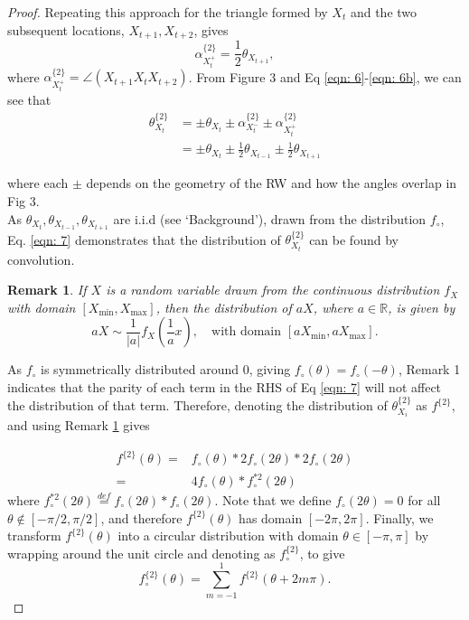 \documentclass[english]{article}
\newtheorem{rem}{Remark}
\begin{document}
\begin{proof}
Repeating this approach for the triangle formed by $X_t$ and the two subsequent locations, $X_{t+1}, X_{t+2}$, gives 
\begin{equation}
    \alpha^{\{2\}}_{X^+_t}=\frac{1}{2}\theta_{X_{t+1}},
    \label{eqn: 6b}
\end{equation}
where $\alpha^{\{2\}}_{X^+_t}=\angle \left(X_{t+1}X_{t}X_{t+2}\right)$.
From Figure 3 and Eq \ref{eqn: 6}-\ref{eqn: 6b},  we can see that 
\begin{align}\nonumber
\theta^{\{2\}}_{X_t}&=\pm\theta_{X_t}\pm\alpha^{\{2\}}_{X^-_t}\pm\alpha^{\{2\}}_{X^+_t}\\
&=\pm\theta_{X_t}\pm\frac{1}{2}\theta_{X_{t-1}}\pm\frac{1}{2}\theta_{X_{t+1}}
\label{eqn: 7}
\end{align}

where each $\pm$ depends on the geometry of the RW and how the angles overlap in Fig 3.\\

As $\theta_{X_t},\theta_{X_{t-1}},\theta_{X_{t+1}}$ are i.i.d (see `Background'), drawn from the distribution $f_\circ$, Eq. \ref{eqn: 7} demonstrates that the distribution of $\theta^{\{2\}}_{X_t}$ can be found by convolution.\\


\begin{rem}
If $X$ is a random variable drawn from the continuous distribution $f_X$ with domain $[X_{\text{min}},X_{\text{max}}]$, then the distribution of $aX$, where $a\in\mathbb{R}$, is given by 
\begin{equation}
    aX\sim\frac{1}{|a|}f_X\left(\frac{1}{a}x\right),\quad \text{with domain }[aX_{\text{min}},aX_{\text{max}}].
    \label{eqn: aX dist}
\end{equation}
\label{rem:1}
\end{rem}


\noindent As $f_{\circ}$ is symmetrically distributed around 0, giving $f_{\circ}(\theta)=f_{\circ}(-\theta)$, Remark 1 indicates that the parity of each term in the RHS of Eq \ref{eqn: 7} will not affect the distribution of that term.  Therefore, denoting the distribution of $\theta^{\{2\}}_{X_i}$ as $f^{\{2\}}$, and using Remark \ref{rem:1} gives

\begin{align} \nonumber
f^{\{2\}}(\theta)=&f_{\circ}(\theta)\ast 2f_{\circ}(2\theta)\ast 2f_{\circ}(2\theta)\\
=&4f_{\circ}(\theta)\ast f^{*2}_{\circ}(2\theta) 
\end{align}
where $f^{*2}_{\circ}(2\theta)\stackrel{def}{=}f_{\circ}(2\theta)\ast f_{\circ}(2\theta)$.  Note that we define $f_\circ(2\theta)=0$ for all $\theta\notin[-\pi/2,\pi/2]$, and therefore $f^{\{2\}}(\theta)$ has domain $[-2\pi,2\pi]$.  Finally, we transform $f^{\{2\}}(\theta)$ into a circular distribution with domain $\theta\in[-\pi,\pi]$ by wrapping around the unit circle and denoting as $f^{\{2\}}_{\circ}$, to give
\begin{equation}
    f^{\{2\}}_{\circ}(\theta)=\sum_{m=-1}^{1}f^{\{2\}}(\theta+2m\pi).
\end{equation}

\end{proof}
\end{document}
